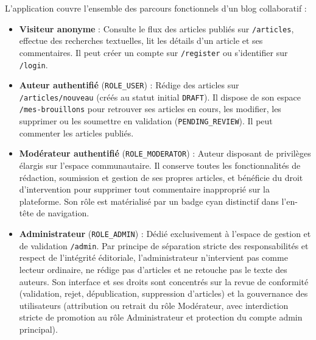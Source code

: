 \documentclass[11pt,a4paper]{article}
\begin{document}
L'application couvre l'ensemble des parcours fonctionnels d'un blog collaboratif :
\begin{itemize}
    \item \textbf{Visiteur anonyme} : Consulte le flux des articles publiés sur \texttt{/articles}, effectue des recherches textuelles, lit les détails d'un article et ses commentaires. Il peut créer un compte sur \texttt{/register} ou s'identifier sur \texttt{/login}.
    \item \textbf{Auteur authentifié} (\texttt{ROLE\_USER}) : Rédige des articles sur \texttt{/articles/nouveau} (créés au statut initial \texttt{DRAFT}). Il dispose de son espace \texttt{/mes-brouillons} pour retrouver ses articles en cours, les modifier, les supprimer ou les soumettre en validation (\texttt{PENDING\_REVIEW}). Il peut commenter les articles publiés.
    \item \textbf{Modérateur authentifié} (\texttt{ROLE\_MODERATOR}) : Auteur disposant de privilèges élargis sur l'espace communautaire. Il conserve toutes les fonctionnalités de rédaction, soumission et gestion de ses propres articles, et bénéficie du droit d'intervention pour supprimer tout commentaire inapproprié sur la plateforme. Son rôle est matérialisé par un badge cyan distinctif dans l'en-tête de navigation.
    \item \textbf{Administrateur} (\texttt{ROLE\_ADMIN}) : Dédié exclusivement à l'espace de gestion et de validation \texttt{/admin}. Par principe de séparation stricte des responsabilités et respect de l'intégrité éditoriale, l'administrateur n'intervient pas comme lecteur ordinaire, ne rédige pas d'articles et ne retouche pas le texte des auteurs. Son interface et ses droits sont concentrés sur la revue de conformité (validation, rejet, dépublication, suppression d'articles) et la gouvernance des utilisateurs (attribution ou retrait du rôle Modérateur, avec interdiction stricte de promotion au rôle Administrateur et protection du compte admin principal).
\end{itemize}
\end{document}
